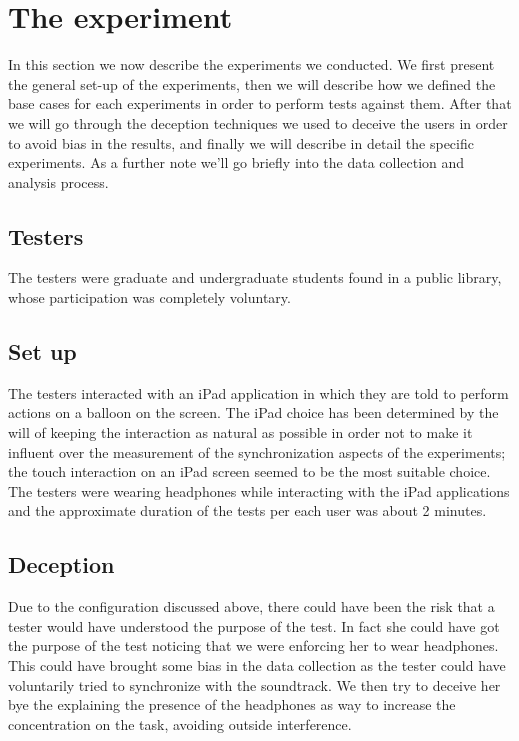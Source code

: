 \section{The experiment}
In this section we now describe the experiments we conducted.
We first present the general set-up of the experiments, then we will describe how we defined the base cases for each experiments in order to perform tests against them.
After that we will go through the deception techniques we used to deceive the users in order to avoid bias in the results, and finally we will describe in detail the specific experiments.
As a further note we'll go briefly into the data collection and analysis process.

\subsection{Testers}
The testers were graduate and undergraduate students found in a public library, whose participation was completely voluntary.

\subsection{Set up}
The testers interacted with an iPad application in which they are told to perform actions on a balloon on the screen. The iPad choice has been determined by the will of keeping the interaction as natural as possible in order not to make it influent over the measurement of the synchronization aspects of the experiments; the touch interaction on an iPad screen seemed to be the most suitable choice.
The testers were wearing headphones while interacting with the iPad applications and the approximate duration of the tests per each user was about 2 minutes.

\subsection{Deception}
Due to the configuration discussed above, there could have been the risk that a tester would have understood the purpose of the test. In fact she could have got the purpose of the test noticing that we were enforcing her to wear headphones. This could have brought some bias in the data collection as the tester could have voluntarily tried to synchronize with the soundtrack.
We then try to deceive her bye the explaining the presence of the headphones as way to increase the concentration on the task, avoiding outside interference.

